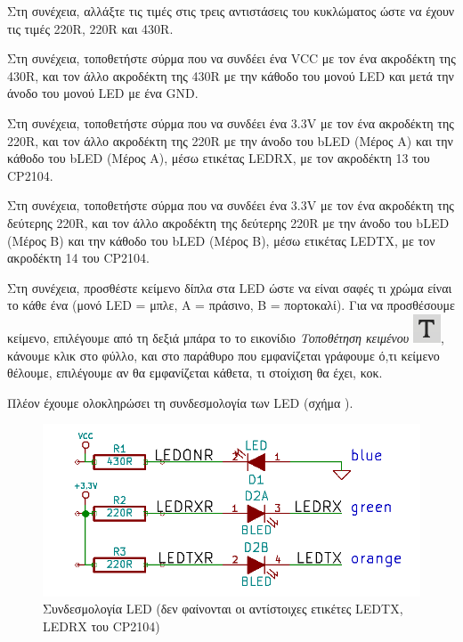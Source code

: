 \documentclass[a4paper]{article}
\begin{document}
Στη συνέχεια, αλλάξτε τις τιμές στις τρεις αντιστάσεις του κυκλώματος ώστε να έχουν τις τιμές 220R, 220R και 430R.

Στη συνέχεια, τοποθετήστε σύρμα που να συνδέει ένα VCC με τον ένα ακροδέκτη της 430R, και τον άλλο ακροδέκτη της 430R με την κάθοδο του μονού LED και μετά την άνοδο του μονού LED με ένα GND.

Στη συνέχεια, τοποθετήστε σύρμα που να συνδέει ένα 3.3V με τον ένα ακροδέκτη της 220R, και τον άλλο ακροδέκτη της 220R με την άνοδο του bLED (Μέρος Α) και την κάθοδο του bLED (Μέρος Α), μέσω ετικέτας LEDRX, με τον ακροδέκτη 13 του CP2104.

Στη συνέχεια, τοποθετήστε σύρμα που να συνδέει ένα 3.3V με τον ένα ακροδέκτη της δεύτερης 220R, και τον άλλο ακροδέκτη της δεύτερης 220R με την άνοδο του bLED (Μέρος Β) και την κάθοδο του bLED (Μέρος Β), μέσω ετικέτας LEDΤX, με τον ακροδέκτη 14 του CP2104.

Στη συνέχεια, προσθέστε κείμενο δίπλα στα LED ώστε να είναι σαφές τι χρώμα είναι το κάθε ένα (μονό LED = μπλε, A = πράσινο, B = πορτοκαλί). Για να προσθέσουμε κείμενο, επιλέγουμε από τη δεξιά μπάρα το το εικονίδιο \textit{Τοποθέτηση κειμένου} \includegraphics[scale=.5]{img/eesch-ico-text.png}, κάνουμε κλικ στο φύλλο, και στο παράθυρο που εμφανίζεται γράφουμε ό,τι κείμενο θέλουμε, επιλέγουμε αν θα εμφανίζεται κάθετα, τι στοίχιση θα έχει, κοκ.

Πλέον έχουμε ολοκληρώσει τη συνδεσμολογία των LED (σχήμα \label{fig:eesch-circ-ledonly}).

\begin{figure}
  \begin{center}
    \includegraphics[width=.9\textwidth]{img/eesch-circ-ledonly.png}
    \caption{Συνδεσμολογία LED (δεν φαίνονται οι αντίστοιχες ετικέτες LEDTX, LEDRX του CP2104)}
    \label{fig:eesch-circ-ledonly}
  \end{center}
\end{figure}
\end{document}
